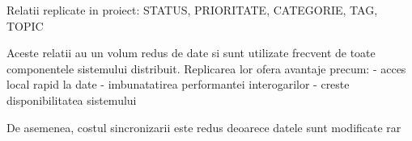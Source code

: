 Relatii replicate in proiect:
STATUS, PRIORITATE, CATEGORIE, TAG, TOPIC

Aceste relatii au un volum redus de date si sunt utilizate frecvent de toate componentele sistemului
distribuit. Replicarea lor ofera avantaje precum:
- acces local rapid la date
- imbunatatirea performantei interogarilor
- creste disponibilitatea sistemului

De asemenea, costul sincronizarii este redus deoarece datele sunt modificate rar